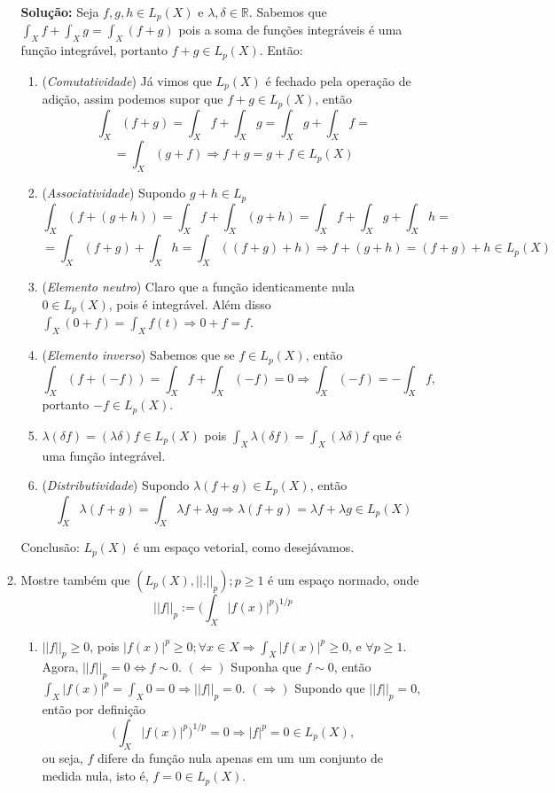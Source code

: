 \documentclass{article}
\begin{document}
\begin{enumerate}
\begin{enumerate}
			\textbf{Solução:} Seja $f, g, h \in L_{p}(X)$ e $\lambda, \delta \in \mathbb{R}$. Sabemos que $\int_{X}f  + \int_{X} g = \int_{X}(f+g)$ pois a soma de funções integráveis é uma função integrável, portanto $f+g \in L_{p}(X)$. Então:
				\begin{enumerate}
					\item (\textit{Comutatividade}) Já vimos que $L_{p}(X)$ é fechado pela operação de adição, assim podemos supor que $f +g \in L_{p}(X)$, então 
					$$
					\int_{X}(f+g) = \int_{X}f+ \int_{X}g =  \int_{X}g+ \int_{X}f =
					$$
					$$
					= \int_{X}(g+ f)  \Rightarrow f+g = g+f \in L_{p}(X)
					$$
					
					\item (\textit{Associatividade}) Supondo $g+h \in L_{p}$
					$$
					\int_{X} (f+(g+h)) = \int_{X} f+ \int_{X}(g+h) = \int_{X} f+ \int_{X} g + \int_{X}h = 
					$$
					$$
					=\int_{X} (f+g) +\int_{X} h = \int_{X}((f+g)+h) \Rightarrow f+(g+h)=(f+g)+h \in L_{p}(X)
					$$
					
					\item (\textit{Elemento neutro}) Claro que a função identicamente nula $0 \in L_{p}(X) $, pois é integrável. Além disso $\int_{X}(0 + f) = \int_{X} f(t) \Rightarrow 0 + f = f$.
					 
					\item (\textit{Elemento inverso}) Sabemos que se $f \in L_{p}(X)$, então 
					$$
					\int_{X}(f + (-f)) = \int_{X} f +\int_{X}(-f)  = 0 \Rightarrow \int_{X}(-f) = - \int_{X}f, 
					$$
					portanto $-f \in L_{p}(X)$.
					
					\item $\lambda(\delta f) = (\lambda \delta) f \in L_{p}(X) $ pois  $\int_{X} \lambda(\delta f) = \int_{X} (\lambda\delta)f$ que é uma função integrável.
					
					\item (\textit{Distributividade}) Supondo $\lambda (f+g) \in L_{p}(X) $, então
					$$
					\int_{X} \lambda (f+g) = \int_{X} \lambda f+ \lambda g \Rightarrow \lambda (f+g)  = \lambda f + \lambda g \in L_{p}(X)
					$$
				\end{enumerate}
				Conclusão: $L_{p}(X)$ é um espaço vetorial, como desejávamos.
				
				\item Mostre também que $(L_{p}(X), ||.||_{p}); p \geq 1$ é um espaço normado, onde
					$$
					||f||_{p} := \Big (\int_{X} |f(x)|^{p} \Big )^{1/p}
					$$
					\begin{enumerate}
						\item $||f||_{p} \geq 0$, pois $|f(x)|^{p} \geq 0; \forall x \in X \Rightarrow \int_{X} |f(x)|^{p} \geq 0$, e $\forall p \geq 1$. Agora, $||f||_{p} = 0 \iff f \sim 0$. $(\Leftarrow)$ Suponha que $f \sim 0$, então $\int_{X} |f(x)|^{p} = \int_{X} 0 = 0 \Rightarrow ||f||_{p} = 0$. $(\Rightarrow)$ Supondo que $||f||_{p} = 0$, então por definição 
						$$
						\Big (\int_{X} |f(x)|^{p} \Big )^{1/p} = 0 \Rightarrow |f|^{p} =0 \in  L_{p}(X), 
						$$
						ou seja, $f$ difere da função nula apenas em um um conjunto de medida nula, isto é, $f = 0 \in  L_{p}(X)$.
						

\end{enumerate}
\end{enumerate}
\end{enumerate}
\end{document}

